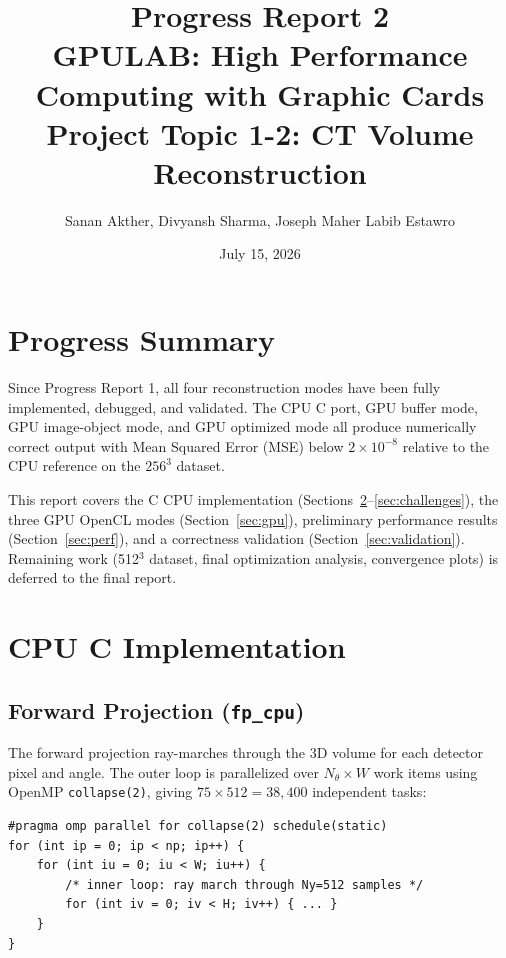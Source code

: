 \documentclass[11pt,a4paper]{article}
\title{\textbf{Progress Report 2}\\
\large GPULAB: High Performance Computing with Graphic Cards\\
Project Topic 1-2: CT Volume Reconstruction}
\author{Sanan Akther, Divyansh Sharma, Joseph Maher Labib Estawro}
\date{July 15, 2026}
\begin{document}
\maketitle
\tableofcontents
\newpage

\section{Progress Summary}

Since Progress Report 1, all four reconstruction modes have been fully implemented,
debugged, and validated. The CPU C port, GPU buffer mode, GPU image-object mode, and
GPU optimized mode all produce numerically correct output with Mean Squared Error
(MSE) below $2 \times 10^{-8}$ relative to the CPU reference on the $256^3$ dataset.

This report covers the C CPU implementation (Sections~\ref{sec:cpu}--\ref{sec:challenges}),
the three GPU OpenCL modes (Section~\ref{sec:gpu}), preliminary performance results
(Section~\ref{sec:perf}), and a correctness validation (Section~\ref{sec:validation}).
Remaining work (512$^3$ dataset, final optimization analysis, convergence plots) is
deferred to the final report.

\section{CPU C Implementation}
\label{sec:cpu}

\subsection{Forward Projection (\texttt{fp\_cpu})}

The forward projection ray-marches through the 3D volume for each detector pixel
and angle. The outer loop is parallelized over $N_\theta \times W$ work items using
OpenMP \texttt{collapse(2)}, giving $75 \times 512 = 38{,}400$ independent tasks:

\begin{lstlisting}
#pragma omp parallel for collapse(2) schedule(static)
for (int ip = 0; ip < np; ip++) {
    for (int iu = 0; iu < W; iu++) {
        /* inner loop: ray march through Ny=512 samples */
        for (int iv = 0; iv < H; iv++) { ... }
    }
}
\end{lstlisting}
\end{document}
